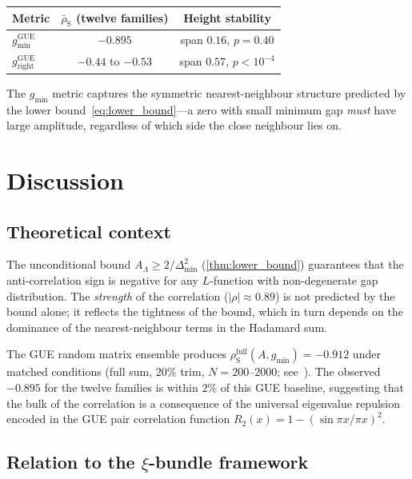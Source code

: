 \documentclass[11pt, a4paper]{article}
\theoremstyle{plain}
\theoremstyle{definition}
\newcommand{\Lam}{\Lambda}
\DeclareMathOperator{\GUE}{GUE}
\begin{document}
\begin{center}
\begin{tabular}{lcc}
\toprule
\textbf{Metric} &
$\bar{\rho}_{\mathrm{S}}$ (twelve families) &
Height stability \\
\midrule
$g_{\min}^{\GUE}$      & $-0.895$ & span $0.16$, $p = 0.40$ \\
$g_{\mathrm{right}}^{\GUE}$ & $-0.44$ to $-0.53$ & span $0.57$, $p < 10^{-4}$ \\
\bottomrule
\end{tabular}
\end{center}

The $g_{\min}$ metric captures the symmetric nearest-neighbour
structure predicted by the lower
bound~\eqref{eq:lower_bound}---a zero with small minimum gap
\emph{must} have large amplitude, regardless of which side the
close neighbour lies on.


\section{Discussion}
\label{sec:discussion}

\subsection{Theoretical context}

The unconditional bound $A_\Lam \ge 2/\Delta_{\min}^2$
(\cref{thm:lower_bound}) guarantees that the anti-correlation
sign is negative for any $L$-function with non-degenerate gap
distribution.
The \emph{strength} of the correlation ($|\rho| \approx 0.89$)
is not predicted by the bound alone; it reflects the tightness
of the bound, which in turn depends on the dominance of the
nearest-neighbour terms in the Hadamard sum.

The GUE random matrix ensemble produces
$\rho_{\mathrm{S}}^{\text{full}}(A, g_{\min}) = -0.912$
under matched conditions (full sum, $20\%$ trim,
$N = 200$--$2000$; see~\cite{paper4draft}).
The observed $-0.895$ for the twelve families is within
$2\%$ of this GUE baseline, suggesting that the bulk of the
correlation is a consequence of the universal eigenvalue
repulsion encoded in the GUE pair correlation function
$R_2(x) = 1 - (\sin\pi x / \pi x)^2$.

\subsection{Relation to the $\xi$-bundle framework}
\end{document}
